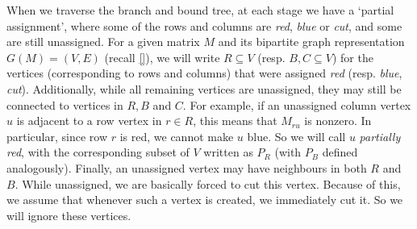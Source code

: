 \documentclass{article}
\begin{document}
	When we traverse the branch and bound tree, at each stage we have a
	`partial assignment', where some of the rows and columns are
	\textit{red}, \textit{blue} or \textit{cut}, and some are still
	unassigned. For a given matrix $M$ and its bipartite graph representation
	$G(M) = (V, E)$ (recall \autoref{}),
	we will write $R \subseteq V$ (resp. $B, C \subseteq V$)
	for the vertices (corresponding to rows and columns) that were assigned
	\textit{red} (resp. \textit{blue}, \textit{cut}). Additionally, while
	all remaining vertices are unassigned, they may still be connected to
	vertices in $R, B$ and $C$. For example, if an unassigned column
	vertex $u$ is
	adjacent to a row vertex in $r \in R$, this means that $M_{ru}$ is nonzero.
	In particular, since row $r$ is red, we cannot make $u$ blue. So we will
	call $u$ \textit{partially red}, with the corresponding subset of $V$
	written as $P_R$ (with $P_B$ defined
	analogously). Finally, an unassigned vertex may have neighbours in both
	$R$ and $B$. While unassigned, we are basically forced to cut this vertex.
	Because of this, we assume that whenever such a vertex is created, we
	immediately cut it. So we will ignore these vertices.
\end{document}
